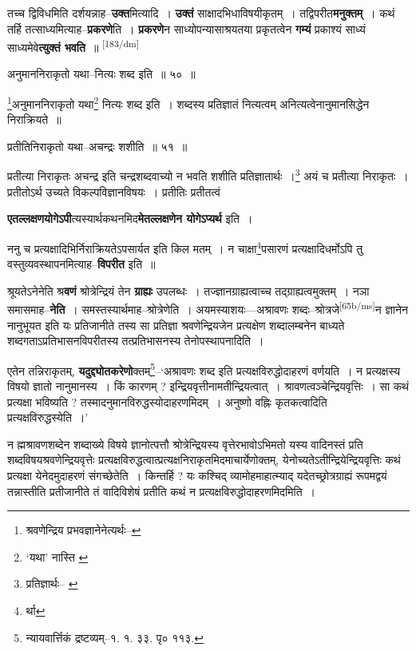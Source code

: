 \documentclass[article,12pt,a4paper]{memoir}
\begin{document}
	  \pstart तच्च द्विविधमिति दर्शयन्नाह--\textbf{उक्त}मित्यादि । \textbf{उक्तं} साक्षादभिधाविषयीकृतम् । तद्विपरीत\textbf{मनुक्तम्} । कथं तर्हि तत्साध्यमित्याह--\textbf{प्रकरणे}ति । \textbf{प्रकरणे}न साध्योपन्यासाश्रयतया प्रकृतत्वेन \textbf{गम्यं} प्रकाश्यं साध्यं साध्यमेवे\textbf{त्युक्तं भवति} ॥
	\pend
      \leavevmode\textsuperscript{\rmlatinfont\tiny [183/dm]}

	  \pstart अनुमाननिराकृतो यथा--नित्यः शब्द इति ॥ ५० ॥
	\pend
       

	  \pstart \footnote{श्रवणेन्द्रिय प्रभवज्ञानेनेत्यर्थः--\cite{dp-msD-n}}अनुमाननिराकृतो यथा\footnote{‘यथा’ नास्ति \cite{dp-msC} \cite{dp-msD} \cite{dp-edH} \cite{dp-edE} \cite{dp-edN}} नित्यः शब्द इति । शब्दस्य प्रतिज्ञातं नित्यत्वम् अनित्यत्वेनानुमानसिद्धेन निराक्रियते ॥
	\pend
       

	  \pstart प्रतीतिनिराकृतो यथा--अचन्द्रः शशीति ॥ ५१ ॥
	\pend
       

	  \pstart प्रतीत्या निराकृतः अचन्द्र इति चन्द्रशब्दवाच्यो न भवति शशीति प्रतिज्ञातार्थः ।\footnote{प्रतिज्ञार्थः--\cite{dp-msC} \cite{dp-msD}} अयं च प्रतीत्या निराकृतः । प्रतीतोऽर्थ उच्यते विकल्पविज्ञानविषयः । प्रतीतिः प्रतीतत्वं
	\pend
      

	  \pstart \textbf{एतल्लक्षणयोगेऽपी}त्यस्यार्थकथनमिद\textbf{मेतल्लक्षणेन योगेऽप्यर्थ} इति ।
	\pend
      

	  \pstart ननु च प्रत्यक्षादिभिर्निराक्रियतेऽपसार्यत इति किल मतम् । न चाक्षा\footnote{र्था}पसारणं प्रत्यक्षादिधर्मोऽपि तु वस्तुव्यवस्थापनमित्याह--\textbf{विपरीत} इति ॥
	\pend
      

	  \pstart श्रूयतेऽनेनेति श्र\textbf{वणं} श्रोत्रेन्द्रियं तेन \textbf{ग्राह्यः} उपलब्धः । तज्ज्ञानग्राह्यत्वाच्च तद्ग्राह्यत्वमुक्तम् । नञा समासमाह--\textbf{नेति} । समस्तस्यार्थमाह--श्रोत्रेणेति । अयमस्याशयः—अश्रावणः शब्दः--श्रोत्रजे\leavevmode\textsuperscript{\rmlatinfont\tiny [65b/ms]}न ज्ञानेन नानुभूयत इति यः प्रतिजानीते तस्य सा प्रतिज्ञा श्रवणेन्द्रियजेन प्रत्यक्षेण शब्दालम्बनेन बाध्यते शब्दगताऽप्रतिभासनविपरीतस्य तत्प्रतिभासनस्य तेनोपस्थापनादिति ।
	\pend
      

	  \pstart एतेन तन्निराकृतम्, \textbf{यदुद्द्योतकरेणो}क्तम्\footnote{न्यायवार्त्तिकं द्रष्टव्यम्--१. १. ३३. पृ० ११३.}--‘अश्रावणः शब्द इति प्रत्यक्षविरुद्धोदाहरणं वर्णयति । न प्रत्यक्षस्य विषयो ज्ञातो नानुमानस्य । किं कारणम् ? इन्द्रियवृत्तीनामतीन्द्रियत्वात् । श्रावणत्वञ्चेन्द्रियवृत्तिः । सा कथं प्रत्यक्षा भविष्यति ? तस्मादनुमानविरुद्धस्योदाहरणमिदम् । अनुष्णो वह्निः कृतकत्वादिति प्रत्यक्षविरुद्धस्येति ।’
	\pend
      

	  \pstart न ह्मश्रावणशब्देन शब्दाख्ये विषये ज्ञानोत्पत्तौ श्रोत्रेन्द्रियस्य वृत्तेरभावोऽभिमतो यस्य वादिनस्तं प्रति शब्दविषयश्रवणेन्द्रियवृत्तेः प्रत्यक्षविरुद्धत्वात्प्रत्यक्षनिराकृतमिदमाचार्येणोक्तम्, येनोच्यतेऽतीन्द्रियेन्द्रियवृत्तिः कथं प्रत्यक्षा येनेदमुदाहरणं संगच्छेतेति । किन्तर्हि ? यः कश्चिद् व्यामोहमाहात्म्याद् यदेतच्छ्रोत्रग्राह्यं रूपमद्वयं तन्नास्तीति प्रतीजानीते तं वादिविशेषं प्रतीति कथं न प्रत्यक्षविरुद्धोदाहरणमिदमिति ।
	\pend
      
\end{document}
